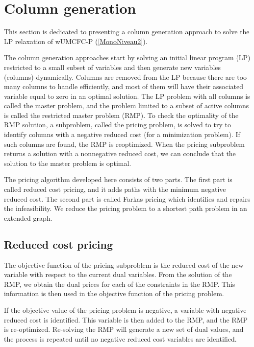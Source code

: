  \section{Column generation}
\label{sec3}
This section is dedicated to presenting a column generation approach to solve the LP relaxation of wUMCFC-P (\ref{MonoNiveau2}).

The column generation approaches \cite{desaulniers2006column,gendron2014branch, lubbecke2005selected, vanderbeck2005} start by solving an initial linear program (LP) restricted to a small subset of variables and then generate new variables (columns) dynamically. Columns are removed from the LP because there are too many columns to handle efficiently, and most of them will have their associated variable equal to zero in an optimal solution. The LP problem with all columns is called the master problem, and the problem limited to a subset of active columns is called the restricted master problem (RMP). To check the optimality of the RMP solution, a subproblem, called the pricing problem, is solved to try to identify columns with a negative reduced cost (for a minimization problem). If such columns are found, the RMP is reoptimized. When the pricing subproblem returns a solution with a nonnegative reduced cost, we can conclude that the solution to the master problem is optimal. 

The pricing algorithm developed here consists of two parts. The first part is called reduced cost pricing, and it adds paths with the minimum negative reduced cost. The second part is called Farkas pricing which identifies and repairs the infeasibility. We reduce the pricing problem to a shortest path problem in an extended graph.

\subsection{Reduced cost pricing}
\label{sec.red}
The objective function of the pricing subproblem is the reduced cost of the new variable with respect to the current dual variables.
From the solution of the RMP, we obtain the dual prices for each of the constraints in the RMP. This information is then used in the objective function of the pricing problem. 

If the objective value of the pricing problem is negative, a variable with negative reduced cost is identified. This variable is then added to the RMP, and the RMP is re-optimized. Re-solving the RMP will generate a new set of dual values, and the process is repeated until no negative reduced cost variables are identified. 

